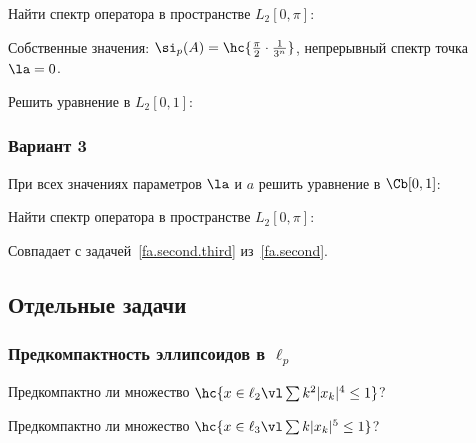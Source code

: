 \documentclass[a4paper]{article}
\begin{document}
\begin{problem}
Найти спектр оператора в пространстве $L_2[0,\pi]$:
\end{problem}
\begin{answer}
Собственные значения: $\si_p(A) = \hc{\frac\pi2\cdot \frac{1}{3^n}}$, непрерывный спектр точка $\la = 0$.
\end{answer}
\begin{problem}\label{fa.second.third}
Решить уравнение в $L_2[0,1]$:
\end{problem}


\subsubsection{Вариант 3}
\setcounter{problem}{0}
\begin{problem}
При всех значениях параметров $\la$ и $a$ решить уравнение в $\Cb[0,1]$:
\end{problem}

\begin{problem}
Найти спектр оператора в пространстве $L_2[0,\pi]$:
\end{problem}

\begin{problem}
Совпадает с задачей~\ref{fa.second.third} из~\ref{fa.second}.
\end{problem}

\subsection{Отдельные задачи}

\setcounter{problem}{0}

\subsubsection{Предкомпактность эллипсоидов в $\ell_p$}

\begin{problem}
Предкомпактно ли множество $\hc{x \in \ell_2 \vl \sum k^2|x_k|^4 \le 1}$?
\end{problem}

\begin{problem}
Предкомпактно ли множество $\hc{x \in \ell_3 \vl \sum k|x_k|^5 \le 1}$?
\end{problem}
\end{document}
